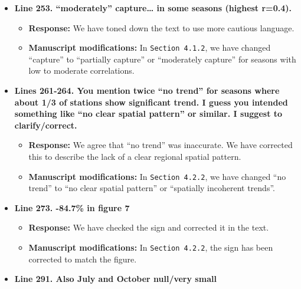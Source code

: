 \documentclass[
  letterpaper,
  DIV=11,
  numbers=noendperiod]{scrartcl}
\providecommand{\tightlist}{%
  \setlength{\itemsep}{0pt}\setlength{\parskip}{0pt}}\usepackage{longtable,booktabs,array}
\begin{document}
\begin{itemize}
  \begin{itemize}
  \tightlist
  \item
    \textbf{Response:} We prefer to keep this figure in the main text as
    an illustration, but we have clarified in the caption that it shows
    a specific example.
  \item
    \textbf{Manuscript modifications:} The caption of Figure 2 has been
    updated to explicitly state: ``This figure illustrates an example of
    the \(M_{3}^{*}\) model showing a positive trend''.
  \end{itemize}
\item
  \textbf{Line 253. ``moderately'' capture\ldots{} in some seasons
  (highest r=0.4).}

  \begin{itemize}
  \tightlist
  \item
    \textbf{Response:} We have toned down the text to use more cautious
    language.
  \item
    \textbf{Manuscript modifications:} In \texttt{Section\ 4.1.2}, we
    have changed ``capture'' to ``partially capture'' or ``moderately
    capture'' for seasons with low to moderate correlations.
  \end{itemize}
\item
  \textbf{Lines 261-264. You mention twice ``no trend'' for seasons
  where about 1/3 of stations show significant trend. I guess you
  intended something like ``no clear spatial pattern'' or similar. I
  suggest to clarify/correct.}

  \begin{itemize}
  \tightlist
  \item
    \textbf{Response:} We agree that ``no trend'' was inaccurate. We
    have corrected this to describe the lack of a clear regional spatial
    pattern.
  \item
    \textbf{Manuscript modifications:} In \texttt{Section\ 4.2.2}, we
    have changed ``no trend'' to ``no clear spatial pattern'' or
    ``spatially incoherent trends''.
  \end{itemize}
\item
  \textbf{Line 273. -84.7\% in figure 7}

  \begin{itemize}
  \tightlist
  \item
    \textbf{Response:} We have checked the sign and corrected it in the
    text.
  \item
    \textbf{Manuscript modifications:} In \texttt{Section\ 4.2.2}, the
    sign has been corrected to match the figure.
  \end{itemize}
\item
  \textbf{Line 291. Also July and October null/very small}


\end{itemize}
\end{document}
